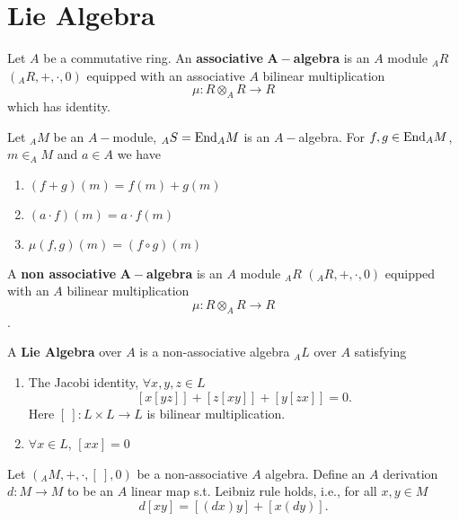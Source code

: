 \section{Lie Algebra}
\begin{definition}
    Let $A$ be a commutative ring. An \textbf{associative }$\mathbf{A-}$\textbf{algebra} is an $A$ module $_AR$ $(_AR, +, \cdot, 0)$ equipped with an associative $A$ bilinear multiplication
    \[\mu: R\otimes_A R\to R\]
    which has identity.
\end{definition}

\begin{example}
    Let $_AM$ be an $A-$module, $_AS=\text{End}_A M$ is an $A-$algebra. For $f, g\in \text{End}_A M$, $m\in _AM$ and $a\in A$ we have
    \begin{enumerate}
        \item $(f+g)(m)=f(m)+g(m)$
        \item $(a\cdot f)(m)=a\cdot f(m)$
        \item $\mu(f, g)(m)=(f\circ g)(m)$
    \end{enumerate}
\end{example}

\begin{definition}
    A \textbf{non associative }$\mathbf{A-}$\textbf{algebra} is an $A$ module $_AR$ $(_AR, +, \cdot, 0)$ equipped with an $A$ bilinear multiplication
    \[\mu: R\otimes_A R\to R\].
\end{definition}

\begin{definition}
    A \textbf{Lie Algebra} over $A$ is a non-associative algebra $_AL$ over $A$ satisfying
    \begin{enumerate}
        \item The Jacobi identity, $\forall x, y, z\in L$
        \[
            [x[yz]]+[z[xy]]+[y[zx]]=0.
        \]
        Here $[\ ]:L\times L\to L$ is bilinear multiplication.
        \item $\forall x\in L$, $[xx]=0$
    \end{enumerate}
\end{definition}

\begin{definition}
    Let $(_AM, +, \cdot, [\ ], 0)$ be a non-associative $A$ algebra. Define an $A$ derivation $d:M\to M$ to be an $A$ linear map s.t. Leibniz rule holds, i.e., for all $x, y\in M$
    \[
        d[xy]=[(dx)y]+[x(dy)] .  
    \]
\end{definition}

